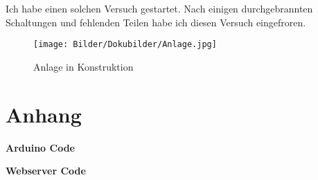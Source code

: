\documentclass[ngerman]{mucproc}
\begin{document}
Ich habe einen solchen Versuch gestartet. Nach einigen durchgebrannten Schaltungen und fehlenden Teilen habe ich diesen Versuch eingefroren. 


\begin{figure}
		\centering
		\texttt{[image: Bilder/Dokubilder/Anlage.jpg]}
		\caption{Anlage in Konstruktion}
		\label{fig:Solaranlage}
	\end{figure}

\newpage



\listoffigures \clearpage

\printbibliography

\newpage
\section{\textbf{Anhang}}

\textbf{Arduino Code}


\textbf{Webserver Code}




\end{document}

